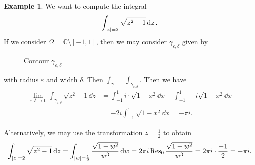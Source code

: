 \documentclass[leqno, openany]{memoir}
\theoremstyle{definition}
\newtheorem{exm}[thm]{Example}
\theoremstyle{remark}
\theoremstyle{plain}
\theoremstyle{definition}
\theoremstyle{remark}
\newcommand{\C}{\mathbb{C}}
\newcommand{\ep}{\varepsilon}
\begin{document}
\begin{exm}
    We want to compute the integral
    \[ \int_{\abs{z} = 2} \sqrt{z^2-1} \dd{z}. \]
    If we consider $\Omega = \C \setminus [-1,1]$, then we may consider $\gamma_{\ep, \delta}$ given by
    \begin{figure}[H]
    \begin{center}
    \end{center}
    \caption{Contour $\gamma_{\ep, \delta}$}%
    \label{fig:contour-6}
    \end{figure}
    with radius $\ep$ and width $\delta$. Then $\int_{\gamma} = \int_{\gamma_{\ep, \delta}}$. Then we have
    \begin{align*} 
        \lim_{\ep, \delta \to 0} \int_{\gamma_{\ep, \delta}} \sqrt{z^2-1} \dd{z} &= \int_{-1}^1 i \cdot \sqrt{1-x^2} \dd{x}+ \int_{-1}^1 -i \sqrt{1-x^2} \dd{x} \\
                                                                                 &= -2i \int_{-1}^1 \sqrt{1-x^2} \dd{x} = -\pi i.
    \end{align*}

    Alternatively, we may use the transformation $z = \frac{1}{2}$ to obtain
    \[ \int_{\abs{z} = 2} \sqrt{z^2-1} \dd{z} = \int_{\abs{w} = \frac{1}{2}} \frac{\sqrt{1-w^2}}{w^3} \dd{w} = 2 \pi i \Res_0 \frac{\sqrt{1-w^2}}{w^3} = 2 \pi i \cdot \frac{-1}{2} = - \pi i. \]
\end{exm}
\end{document}
